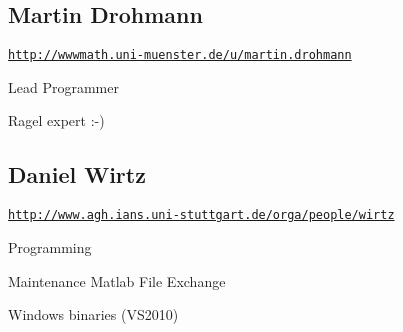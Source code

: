 \hypertarget{developers_md}{}\subsection{Martin Drohmann}\label{developers_md}
\href{http://wwwmath.uni-muenster.de/u/martin.drohmann}{\tt http\+://wwwmath.\+uni-\/muenster.\+de/u/martin.\+drohmann}


\begin{DoxyItemize}
\item Lead Programmer
\item Ragel expert \+:-\/)
\end{DoxyItemize}\hypertarget{developers_dw}{}\subsection{Daniel Wirtz}\label{developers_dw}
\href{http://www.agh.ians.uni-stuttgart.de/orga/people/wirtz}{\tt http\+://www.\+agh.\+ians.\+uni-\/stuttgart.\+de/orga/people/wirtz}


\begin{DoxyItemize}
\item Programming
\item Maintenance Matlab File Exchange
\item Windows binaries (V\+S2010) 
\end{DoxyItemize}
